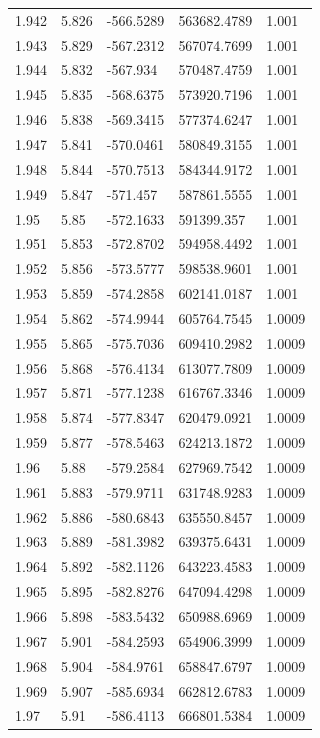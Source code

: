 \begin{tabular}{lllll}
1.942 & 5.826 & -566.5289 & 563682.4789 & 1.001 \\
1.943 & 5.829 & -567.2312 & 567074.7699 & 1.001 \\
1.944 & 5.832 & -567.934 & 570487.4759 & 1.001 \\
1.945 & 5.835 & -568.6375 & 573920.7196 & 1.001 \\
1.946 & 5.838 & -569.3415 & 577374.6247 & 1.001 \\
1.947 & 5.841 & -570.0461 & 580849.3155 & 1.001 \\
1.948 & 5.844 & -570.7513 & 584344.9172 & 1.001 \\
1.949 & 5.847 & -571.457 & 587861.5555 & 1.001 \\
1.95 & 5.85 & -572.1633 & 591399.357 & 1.001 \\
1.951 & 5.853 & -572.8702 & 594958.4492 & 1.001 \\
1.952 & 5.856 & -573.5777 & 598538.9601 & 1.001 \\
1.953 & 5.859 & -574.2858 & 602141.0187 & 1.001 \\
1.954 & 5.862 & -574.9944 & 605764.7545 & 1.0009 \\
1.955 & 5.865 & -575.7036 & 609410.2982 & 1.0009 \\
1.956 & 5.868 & -576.4134 & 613077.7809 & 1.0009 \\
1.957 & 5.871 & -577.1238 & 616767.3346 & 1.0009 \\
1.958 & 5.874 & -577.8347 & 620479.0921 & 1.0009 \\
1.959 & 5.877 & -578.5463 & 624213.1872 & 1.0009 \\
1.96 & 5.88 & -579.2584 & 627969.7542 & 1.0009 \\
1.961 & 5.883 & -579.9711 & 631748.9283 & 1.0009 \\
1.962 & 5.886 & -580.6843 & 635550.8457 & 1.0009 \\
1.963 & 5.889 & -581.3982 & 639375.6431 & 1.0009 \\
1.964 & 5.892 & -582.1126 & 643223.4583 & 1.0009 \\
1.965 & 5.895 & -582.8276 & 647094.4298 & 1.0009 \\
1.966 & 5.898 & -583.5432 & 650988.6969 & 1.0009 \\
1.967 & 5.901 & -584.2593 & 654906.3999 & 1.0009 \\
1.968 & 5.904 & -584.9761 & 658847.6797 & 1.0009 \\
1.969 & 5.907 & -585.6934 & 662812.6783 & 1.0009 \\
1.97 & 5.91 & -586.4113 & 666801.5384 & 1.0009 \\

\end{tabular}
